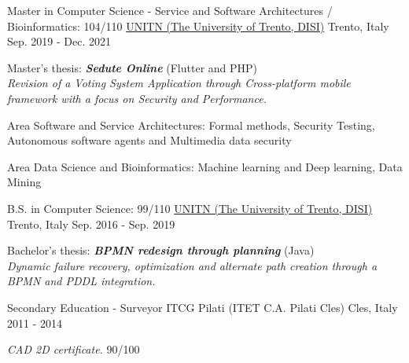 

\begin{cventries}

\cventry
{Master in Computer Science - Service and Software Architectures / Bioinformatics: 104/110} %
{\href{https://www.unitn.it/}{UNITN (The University of Trento, DISI)}}  %
{Trento, Italy} %
{Sep. 2019 - Dec. 2021} %
{
  \begin{cvitems} %
    \item {Master's thesis: \textbf{\textit{Sedute Online}} (Flutter and PHP)\\\textit{Revision of a Voting System Application through Cross-platform mobile framework with a focus on Security and Performance.}}
    \item {Area Software and Service Architectures: Formal methods, Security Testing, Autonomous software agents and Multimedia data security}
    \item {Area Data Science and Bioinformatics: Machine learning and Deep learning, Data Mining}
  \end{cvitems}
}

\cventry
{B.S. in Computer Science: 99/110} %
{\href{https://www.unitn.it/}{UNITN (The University of Trento, DISI)}}  %
{Trento, Italy} %
{Sep. 2016 - Sep. 2019} %
{
  \begin{cvitems} %
    \item {Bachelor's thesis: \textbf{\textit{BPMN redesign through planning}} (Java)\\\textit{Dynamic failure recovery, optimization and alternate path creation through a BPMN and PDDL integration.}}
  \end{cvitems}
}

 \cventry
 {Secondary Education - Surveyor} %
 {ITCG Pilati (ITET C.A. Pilati Cles)} %
 {Cles, Italy} %
 {2011 - 2014} %
 {
   \begin{cvitems} %
     \item {\textit{CAD 2D certificate.}  90/100}
   \end{cvitems}
 }
\end{cventries}
